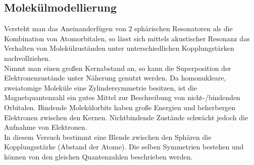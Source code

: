 \documentclass[numbers=noenddot,12pt,a4paper]{scrartcl}
\begin{document}
\subsection{Molekülmodellierung}
Versteht man das Aneinanderfügen von 2 sphärischen Resonatoren als die Kombination von Atomorbitalen, so lässt sich mittels akustischer Resonanz das Verhalten von Molekülzuständen unter unterschiedlichen Kopplungstärken nachvollziehen.\\
Nimmt man einen großen Kernabstand an, so kann die Superposition der Elektronenzustände unter Näherung genutzt werden. Da homonukleare, zweiatomige Moleküle eine Zylindersymmetrie besitzen, ist die Magnetquantenzahl ein gutes Mittel zur Beschreibung von nicht-/bindenden Orbitalen. Bindende Molekülorbits haben große Energien und beherbergen Elektronen zwischen den Kernen. Nichtbindende Zustände schwächt jedoch die Aufnahme von Elektronen.\\
In diesem Versuch bestimmt eine Blende zwischen den Sphären die Kopplungsstärke (Abstand der Atome). Die selben Symmetrien bestehen und können von den gleichen Quantenzahlen beschrieben werden.
\end{document}
